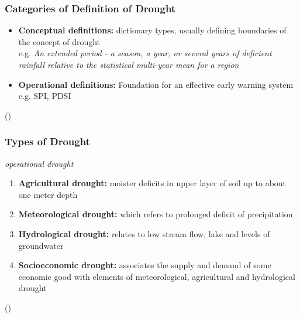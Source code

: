 \documentclass{beamer}              %
\begin{document}
\begin{frame}\label{Definition of Drought}
\frametitle{Categories of Definition of Drought} 
 \begin{itemize}


\item \textbf{Conceptual definitions:} dictionary types, usually defining boundaries of the concept of drought \\ 
e.g. \textit{An extended period - a season, a year, or several years of deficient rainfall relative to the statistical multi-year mean for a region \citep{schneider1996}}
\item \textbf{Operational definitions:} Foundation for an effective early warning system \\ e.g. SPI, PDSI

\end{itemize} 

(\citealp{wilhite1985,wilhite2000})
\end{frame}



\begin{frame}
\frametitle{Types of Drought}
\textit{operational drought} \\
  \begin{enumerate}
      \item \textbf{Agricultural drought:} moister deficits in upper layer of
soil up to about one meter depth
      \item \textbf{Meteorological drought:} which refers to prolonged
deficit of precipitation
      \item \textbf{Hydrological drought:} relates to low stream flow, lake and levels of groundwater
      \item \textbf{Socioeconomic drought:} associates the supply and demand of some economic good with elements of meteorological, agricultural and hydrological drought
  \end{enumerate}
  (\citealp{heim2002,IPCCtrenberth,AMS2013})
\end{frame}
\end{document}
